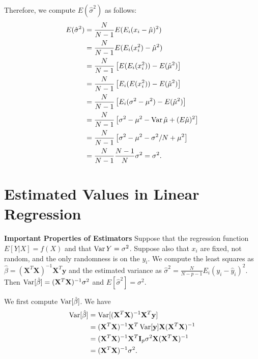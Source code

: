 \documentclass[11pt]{article}
\theoremstyle{definition}
\newcommand{\XX}{\mathbf{X}}
\newcommand{\yy}{\mathbf{y}}
\newcommand{\II}{\mathbf{I}}
\begin{document}
Therefore, we compute $E(\hat\sigma^2)$ as follows:
\begin{equation}
	\begin{split}
		E(\hat\sigma^2) &= \frac{N}{N-1}E(E_i(x_i-\hat \mu)^2) \\
		&= \frac{N}{N-1}E(E_i(x_i^2) - \hat\mu^2) \\
		&= \frac{N}{N-1}\left[E(E_i(x_i^2)) - E(\hat\mu^2)\right] \\
		&= \frac{N}{N-1}\left[E_i(E(x_i^2)) - E(\hat\mu^2)\right] \\
		&= \frac{N}{N-1}\left[E_i(\sigma^2-\mu^2) - E(\hat\mu^2)\right] \\
		&= \frac{N}{N-1}\left[\sigma^2-\mu^2 - \operatorname*{Var}\hat\mu+(E\hat\mu)^2\right] \\
		&= \frac{N}{N-1}\left[\sigma^2-\mu^2 - \sigma^2/N+\mu^2\right] \\
		&= \frac{N}{N-1}\frac{N-1}{N}\sigma^2 = \sigma^2.
	\end{split}
\end{equation}

\section{Estimated Values in Linear Regression}

\begin{shaded}
	\textbf{Important Properties of Estimators} \newline
	Suppose that the regression function $E[Y|X]=f(X)$ and that $\operatorname*{Var}
		Y=\sigma^2$. Suppose also that $x_i$ are fixed, not random, and the only
	randomness is on the $y_i$. We compute the least squares as $\hat\beta =
		(\XX^T\XX)^{-1}\XX^T\yy$ and the estimated variance as
	$\hat\sigma^2=\frac{N}{N-p-1}E_i(y_i-\hat y_i)^2$. Then
	$\Var[\hat\beta]=(\XX^T\XX)^{-1}\sigma^2$ and $E[\hat\sigma^2]=\sigma^2$.
\end{shaded}

We first compute $\operatorname*{Var}[\hat\beta]$. We have
\begin{equation}
	\begin{split}
		\Var[\hat\beta] &= \Var[(\XX^T\XX)^{-1}\XX^T\yy] \\
		&= (\XX^T\XX)^{-1}\XX^T \Var[\yy] \XX(\XX^T\XX)^{-1} \\
		&= (\XX^T\XX)^{-1}\XX^T \II_p\sigma^2 \XX(\XX^T\XX)^{-1} \\
		&= (\XX^T\XX)^{-1}\sigma^2.
	\end{split}
\end{equation}
\end{document}
